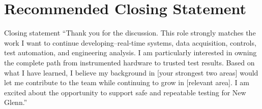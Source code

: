 \documentclass[11pt]{article}
\begin{document}
\section{Recommended Closing Statement}

\begin{answerbox}{Closing statement}
``Thank you for the discussion. This role strongly matches the work I want to
continue developing--real-time systems, data acquisition, controls, test
automation, and engineering analysis. I am particularly interested in owning the
complete path from instrumented hardware to trusted test results. Based on what
I have learned, I believe my background in [your strongest two areas] would let
me contribute to the team while continuing to grow in [relevant area]. I am
excited about the opportunity to support safe and repeatable testing for New
Glenn.''
\end{answerbox}
\end{document}
